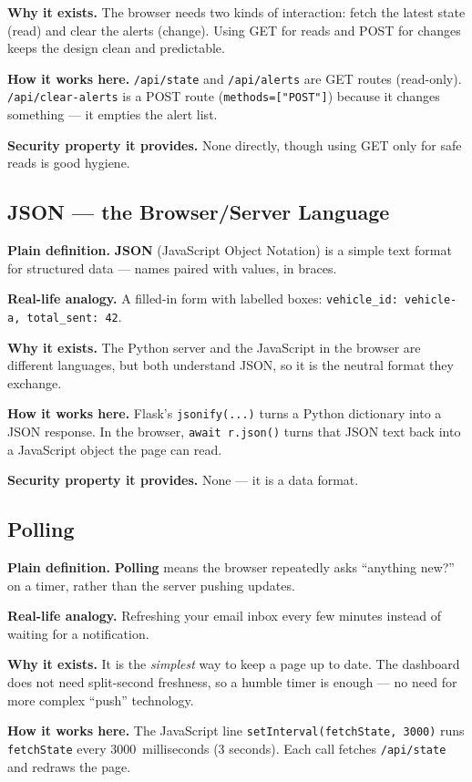\documentclass[11pt,a4paper]{report}
\begin{document}
\textbf{Why it exists.} The browser needs two kinds of interaction: fetch the
latest state (read) and clear the alerts (change). Using GET for reads and POST
for changes keeps the design clean and predictable.

\textbf{How it works here.} \texttt{/api/state} and \texttt{/api/alerts} are GET
routes (read-only). \texttt{/api/clear-alerts} is a POST route
(\texttt{methods=["POST"]}) because it changes something --- it empties the alert
list.

\textbf{Security property it provides.} None directly, though using GET only for
safe reads is good hygiene.

\subsection{JSON --- the Browser/Server Language}
\textbf{Plain definition.} \textbf{JSON} (JavaScript Object Notation) is a simple
text format for structured data --- names paired with values, in braces.

\textbf{Real-life analogy.} A filled-in form with labelled boxes:
\texttt{vehicle\_id: vehicle-a, total\_sent: 42}.

\textbf{Why it exists.} The Python server and the JavaScript in the browser are
different languages, but both understand JSON, so it is the neutral format they
exchange.

\textbf{How it works here.} Flask's \texttt{jsonify(...)} turns a Python
dictionary into a JSON response. In the browser, \texttt{await r.json()} turns
that JSON text back into a JavaScript object the page can read.

\textbf{Security property it provides.} None --- it is a data format.

\subsection{Polling}
\textbf{Plain definition.} \textbf{Polling} means the browser repeatedly asks
``anything new?'' on a timer, rather than the server pushing updates.

\textbf{Real-life analogy.} Refreshing your email inbox every few minutes instead
of waiting for a notification.

\textbf{Why it exists.} It is the \emph{simplest} way to keep a page up to date.
The dashboard does not need split-second freshness, so a humble timer is enough
--- no need for more complex ``push'' technology.

\textbf{How it works here.} The JavaScript line \texttt{setInterval(fetchState,
3000)} runs \texttt{fetchState} every 3000~milliseconds (3 seconds). Each call
fetches \texttt{/api/state} and redraws the page.
\end{document}
